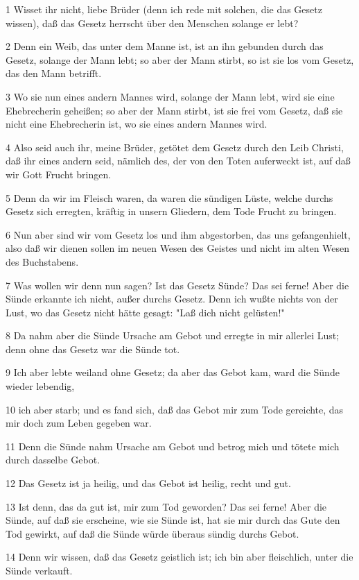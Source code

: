 \par 1 Wisset ihr nicht, liebe Brüder (denn ich rede mit solchen, die das Gesetz wissen), daß das Gesetz herrscht über den Menschen solange er lebt?
\par 2 Denn ein Weib, das unter dem Manne ist, ist an ihn gebunden durch das Gesetz, solange der Mann lebt; so aber der Mann stirbt, so ist sie los vom Gesetz, das den Mann betrifft.
\par 3 Wo sie nun eines andern Mannes wird, solange der Mann lebt, wird sie eine Ehebrecherin geheißen; so aber der Mann stirbt, ist sie frei vom Gesetz, daß sie nicht eine Ehebrecherin ist, wo sie eines andern Mannes wird.
\par 4 Also seid auch ihr, meine Brüder, getötet dem Gesetz durch den Leib Christi, daß ihr eines andern seid, nämlich des, der von den Toten auferweckt ist, auf daß wir Gott Frucht bringen.
\par 5 Denn da wir im Fleisch waren, da waren die sündigen Lüste, welche durchs Gesetz sich erregten, kräftig in unsern Gliedern, dem Tode Frucht zu bringen.
\par 6 Nun aber sind wir vom Gesetz los und ihm abgestorben, das uns gefangenhielt, also daß wir dienen sollen im neuen Wesen des Geistes und nicht im alten Wesen des Buchstabens.
\par 7 Was wollen wir denn nun sagen? Ist das Gesetz Sünde? Das sei ferne! Aber die Sünde erkannte ich nicht, außer durchs Gesetz. Denn ich wußte nichts von der Lust, wo das Gesetz nicht hätte gesagt: "Laß dich nicht gelüsten!"
\par 8 Da nahm aber die Sünde Ursache am Gebot und erregte in mir allerlei Lust; denn ohne das Gesetz war die Sünde tot.
\par 9 Ich aber lebte weiland ohne Gesetz; da aber das Gebot kam, ward die Sünde wieder lebendig,
\par 10 ich aber starb; und es fand sich, daß das Gebot mir zum Tode gereichte, das mir doch zum Leben gegeben war.
\par 11 Denn die Sünde nahm Ursache am Gebot und betrog mich und tötete mich durch dasselbe Gebot.
\par 12 Das Gesetz ist ja heilig, und das Gebot ist heilig, recht und gut.
\par 13 Ist denn, das da gut ist, mir zum Tod geworden? Das sei ferne! Aber die Sünde, auf daß sie erscheine, wie sie Sünde ist, hat sie mir durch das Gute den Tod gewirkt, auf daß die Sünde würde überaus sündig durchs Gebot.
\par 14 Denn wir wissen, daß das Gesetz geistlich ist; ich bin aber fleischlich, unter die Sünde verkauft.
